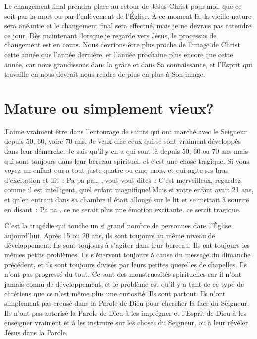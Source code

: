 Le changement final prendra place au retour de Jésus-Christ pour moi,
 que ce soit par la mort ou par l'enlèvement de l'Église.
 À ce moment là, la vieille nature sera anéantie et le changement final
 sera effectué, mais je ne devrais pas attendre ce jour.
 Dès maintenant, lorsque je regarde vers Jésus, le processus de changement
 est en cours. Nous devrions être plus proche de l'image de Christ
 cette année que l'année dernière, et l'année prochaine plus encore
 que cette année, car nous grandissons dans la grâce et dans Sa connaissance,
 et l'Esprit qui travaille en nous devrait nous rendre
 de plus en plus à Son image.


\section*{Mature ou simplement vieux?}

J'aime vraiment être dans l'entourage de saints
 qui ont marché avec le Seigneur depuis 50, 60, voire 70 ans.
 Je veux dire ceux qui se sont vraiment développés dans leur démarche.
 Je sais qu'il y en a qui sont là depuis 50, 60 ou 70 ans mais qui sont
 toujours dans leur berceau spirituel, et c'est une chose tragique.
 Si vous voyez un enfant qui a tout juste quatre ou cinq mois,
 et qui agite ses bras d'excitation et dit~:
 \og Pa pa pa\dots{} \fg{}, vous vous dites~:
 \og C'est merveilleux, regardez comme il est intelligent,
 quel enfant magnifique! \fg{} 
 Mais si votre enfant avait 21 ans, et qu'en entrant dans sa chambre
 il était allongé sur le lit et se mettait à sourire en disant~:
 \og Pa pa \fg{}, ce ne serait plus une émotion excitante,
 ce serait tragique.

C'est la tragédie qui touche un si grand nombre de personnes
 dans l'Église aujourd'hui. Après 15 ou 20 ans,
 ils sont toujours au même niveau de développement.
 Ils sont toujours à s'agiter dans leur berceau.
 Ils ont toujours les mêmes petits problèmes.
 Ils s'énervent toujours à cause du message du dimanche précédent,
 et ils sont toujours divisés par leurs petites querelles de chapelles.
 Ils n'ont pas progressé du tout. Ce sont des monstruosités spirituelles
 car il n'ont jamais connu de développement, et le problème est qu'il y a
 tant de ce type de chrétiens que ce n'est même plus une curiosité.
 Ils sont partout. Ils n'ont simplement pas creusé dans la Parole de Dieu
 pour chercher la face du Seigneur. Ils n'ont pas autorisé la Parole de Dieu
 à les imprégner et l'Esprit de Dieu à les enseigner vraiment et
 à les instruire sur les choses du Seigneur,
 ou à leur révéler Jésus dans la Parole.


